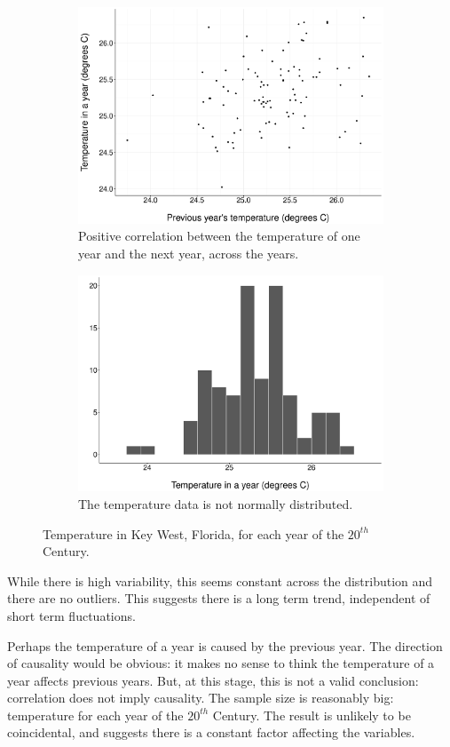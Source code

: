 \documentclass[11pt]{article}
\begin{document}
\begin{figure}[h]
\centering
\begin{subfigure}{.5\textwidth}
	\centering
	\includegraphics[width=0.8\linewidth]{../Results/AutoCorr_Scatter.pdf}
   \caption{Positive correlation between the temperature of one year and the next year, across the years.}
\end{subfigure}%
\begin{subfigure}{.5\textwidth}
  \centering
  \includegraphics[width=0.8\linewidth]{../Results/AutoCorr_Hist.pdf}
  \caption{The temperature data is not normally distributed.}
\end{subfigure}
\caption{Temperature in Key West, Florida, for each year of the $20^{th}$ Century.}
\end{figure}

While there is high variability, this seems constant across the distribution and there are no outliers. This suggests there is a long term trend, independent of short term fluctuations.

Perhaps the temperature of a year is caused by the previous year. The direction of causality would be obvious: it makes no sense to think the temperature of a year affects previous years. But, at this stage, this is not a valid conclusion: correlation does not imply causality. The sample size is reasonably big: temperature for each year of the $20^{th}$ Century. The result is unlikely to be coincidental, and suggests there is a constant factor affecting the variables.
\end{document}
